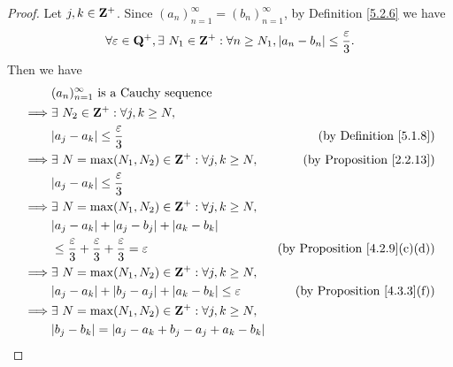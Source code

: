 \begin{proof}
    Let \(j, k \in \mathbf{Z}^+\).
    Since \((a_n)_{n = 1}^\infty = (b_n)_{n = 1}^\infty\), by Definition \ref{5.2.6} we have
    \[
        \forall \varepsilon \in \mathbf{Q}^+, \exists\ N_1 \in \mathbf{Z}^+ : \forall n \geq N_1, \left\lvert a_n - b_n\right\rvert \leq \frac{\varepsilon}{3}.
    \]
    Then we have
    \begin{align*}
                 & (a_n)_{n = 1}^\infty \text{ is a Cauchy sequence}                                                                                    \\
        \implies & \exists\ N_2 \in \Z^+ : \forall j, k \geq N,                                                                                         \\
                 & \abs{a_j - a_k} \leq \frac{\varepsilon}{3}                                               & \text{(by Definition \ref{5.1.8})}        \\
        \implies & \exists\ N = \max(N_1, N_2) \in \Z^+ : \forall j, k \geq N,                              & \text{(by Proposition \ref{2.2.13})}      \\
                 & \abs{a_j - a_k} \leq \frac{\varepsilon}{3}                                                                                           \\
        \implies & \exists\ N = \max(N_1, N_2) \in \Z^+ : \forall j, k \geq N,                                                                          \\
                 & \abs{a_j - a_k} + \abs{a_j - b_j} + \abs{a_k - b_k}                                                                                  \\
                 & \leq \frac{\varepsilon}{3} + \frac{\varepsilon}{3} + \frac{\varepsilon}{3} = \varepsilon & \text{(by Proposition \ref{4.2.9}(c)(d))} \\
        \implies & \exists\ N = \max(N_1, N_2) \in \Z^+ : \forall j, k \geq N,                                                                          \\
                 & \abs{a_j - a_k} + \abs{b_j - a_j} + \abs{a_k - b_k} \leq \varepsilon                     & \text{(by Proposition \ref{4.3.3}(f))}    \\
        \implies & \exists\ N = \max(N_1, N_2) \in \Z^+ : \forall j, k \geq N,                                                                          \\
                 & \abs{b_j - b_k} = \abs{a_j - a_k + b_j - a_j + a_k - b_k}                                                                            \\

\end{align*}
\end{proof}

